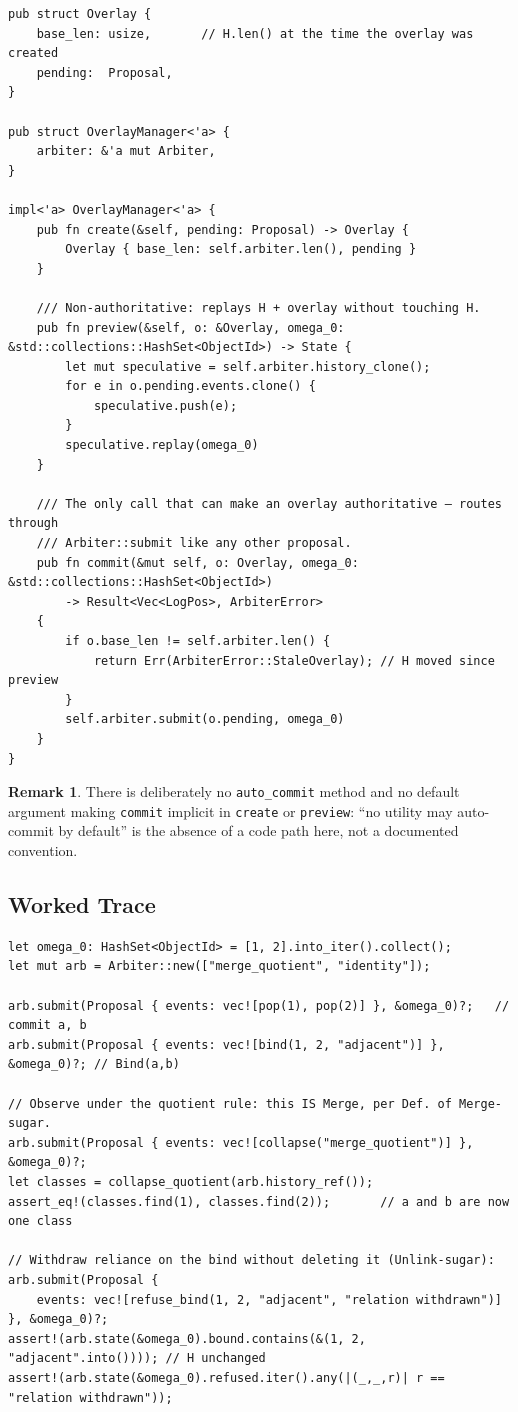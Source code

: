 \documentclass[12pt]{article}
\theoremstyle{definition}
\newtheorem{remark}{Remark}
\begin{document}
\begin{verbatim}
pub struct Overlay {
    base_len: usize,       // H.len() at the time the overlay was created
    pending:  Proposal,
}

pub struct OverlayManager<'a> {
    arbiter: &'a mut Arbiter,
}

impl<'a> OverlayManager<'a> {
    pub fn create(&self, pending: Proposal) -> Overlay {
        Overlay { base_len: self.arbiter.len(), pending }
    }

    /// Non-authoritative: replays H + overlay without touching H.
    pub fn preview(&self, o: &Overlay, omega_0: &std::collections::HashSet<ObjectId>) -> State {
        let mut speculative = self.arbiter.history_clone();
        for e in o.pending.events.clone() {
            speculative.push(e);
        }
        speculative.replay(omega_0)
    }

    /// The only call that can make an overlay authoritative — routes through
    /// Arbiter::submit like any other proposal.
    pub fn commit(&mut self, o: Overlay, omega_0: &std::collections::HashSet<ObjectId>)
        -> Result<Vec<LogPos>, ArbiterError>
    {
        if o.base_len != self.arbiter.len() {
            return Err(ArbiterError::StaleOverlay); // H moved since preview
        }
        self.arbiter.submit(o.pending, omega_0)
    }
}
\end{verbatim}

\begin{remark}
There is deliberately no \texttt{auto\_commit} method and no default argument making \texttt{commit} implicit in \texttt{create} or \texttt{preview}: ``no utility may auto-commit by default'' is the absence of a code path here, not a documented convention.
\end{remark}

\subsection{Worked Trace}

\begin{verbatim}
let omega_0: HashSet<ObjectId> = [1, 2].into_iter().collect();
let mut arb = Arbiter::new(["merge_quotient", "identity"]);

arb.submit(Proposal { events: vec![pop(1), pop(2)] }, &omega_0)?;   // commit a, b
arb.submit(Proposal { events: vec![bind(1, 2, "adjacent")] }, &omega_0)?; // Bind(a,b)

// Observe under the quotient rule: this IS Merge, per Def. of Merge-sugar.
arb.submit(Proposal { events: vec![collapse("merge_quotient")] }, &omega_0)?;
let classes = collapse_quotient(arb.history_ref());
assert_eq!(classes.find(1), classes.find(2));       // a and b are now one class

// Withdraw reliance on the bind without deleting it (Unlink-sugar):
arb.submit(Proposal {
    events: vec![refuse_bind(1, 2, "adjacent", "relation withdrawn")]
}, &omega_0)?;
assert!(arb.state(&omega_0).bound.contains(&(1, 2, "adjacent".into()))); // H unchanged
assert!(arb.state(&omega_0).refused.iter().any(|(_,_,r)| r == "relation withdrawn"));
\end{verbatim}
\end{document}
